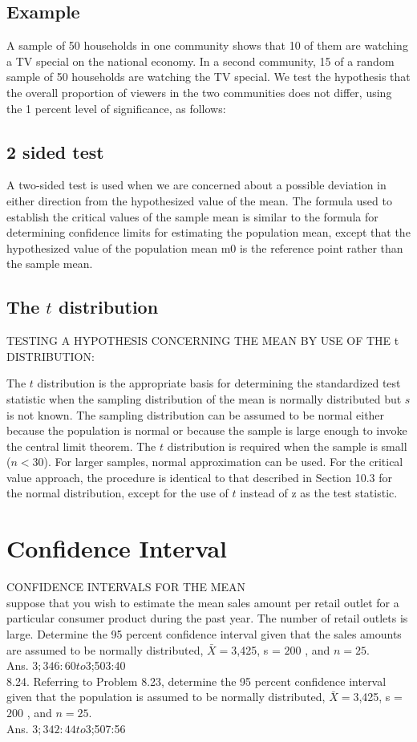 \subsection{Example} A sample of 50 households in one community
shows that 10 of them are watching a TV special on the national
economy. In a second community, 15 of a random sample of 50
households are watching the TV special. We test the hypothesis
that the overall proportion of viewers in the two communities does
not differ, using the 1 percent level of significance, as follows:

\subsection{2 sided test}
A two-sided test is used when we are concerned about a possible
deviation in either direction from the hypothesized value of the
mean. The formula used to establish the critical values of the
sample mean is similar to the formula for determining confidence
limits for estimating the population mean, except that the
hypothesized value of the population mean m0 is the reference
point rather than the sample mean.



\subsection{The $t$ distribution}
TESTING A HYPOTHESIS CONCERNING THE MEAN BY USE OF THE t
DISTRIBUTION:

The $t$ distribution is the appropriate basis for
determining the standardized test statistic when the sampling
distribution of the mean is normally distributed but $s$ is not
known. The sampling distribution can be assumed to be normal
either because the population is normal or because the sample is
large enough to invoke the central limit theorem. The $t$
distribution is required when the sample is small ($n < 30$). For
larger samples, normal approximation can be used. For the critical
value approach, the procedure is identical to that described in
Section 10.3 for the normal distribution, except for the use of $t$
instead of z as the test statistic.

\section{Confidence Interval} CONFIDENCE INTERVALS FOR THE MEAN\\
suppose that you wish to estimate the mean sales amount per
retail outlet for a particular consumer product during the past
year. The number of retail outlets is large. Determine the
95 percent confidence interval given that the sales amounts are
assumed to be normally distributed, $\bar{X} = $3,425, s = $200$ ,
and $n = 25.$\\ Ans. $3;346:60 to $3;503:40
\\
8.24. Referring to Problem 8.23, determine the 95 percent
confidence interval given that the population is assumed to be
normally distributed, $\bar{X} = $3,425, s = $200$ , and $n = 25.$
\\Ans. $3;342:44 to $3;507:56

